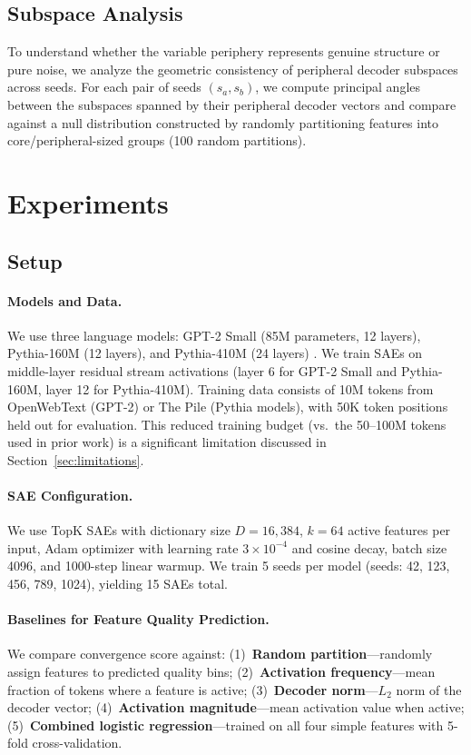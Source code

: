 \documentclass[final]{article}
\begin{document}
\subsection{Subspace Analysis}

To understand whether the variable periphery represents genuine structure or pure noise, we analyze the geometric consistency of peripheral decoder subspaces across seeds. For each pair of seeds $(s_a, s_b)$, we compute principal angles between the subspaces spanned by their peripheral decoder vectors and compare against a null distribution constructed by randomly partitioning features into core/peripheral-sized groups (100 random partitions).

\section{Experiments}
\label{sec:experiments}

\subsection{Setup}

\paragraph{Models and Data.} We use three language models: GPT-2 Small (85M parameters, 12 layers), Pythia-160M (12 layers), and Pythia-410M (24 layers) \citep{biderman2023pythia}. We train SAEs on middle-layer residual stream activations (layer 6 for GPT-2 Small and Pythia-160M, layer 12 for Pythia-410M). Training data consists of 10M tokens from OpenWebText (GPT-2) or The Pile (Pythia models), with 50K token positions held out for evaluation. This reduced training budget (vs.\ the 50--100M tokens used in prior work) is a significant limitation discussed in Section~\ref{sec:limitations}.

\paragraph{SAE Configuration.} We use TopK SAEs with dictionary size $D{=}16{,}384$, $k{=}64$ active features per input, Adam optimizer with learning rate $3{\times}10^{-4}$ and cosine decay, batch size 4096, and 1000-step linear warmup. We train 5 seeds per model (seeds: 42, 123, 456, 789, 1024), yielding 15 SAEs total.

\paragraph{Baselines for Feature Quality Prediction.} We compare convergence score against: (1)~\textbf{Random partition}---randomly assign features to predicted quality bins; (2)~\textbf{Activation frequency}---mean fraction of tokens where a feature is active; (3)~\textbf{Decoder norm}---$L_2$ norm of the decoder vector; (4)~\textbf{Activation magnitude}---mean activation value when active; (5)~\textbf{Combined logistic regression}---trained on all four simple features with 5-fold cross-validation.
\end{document}

